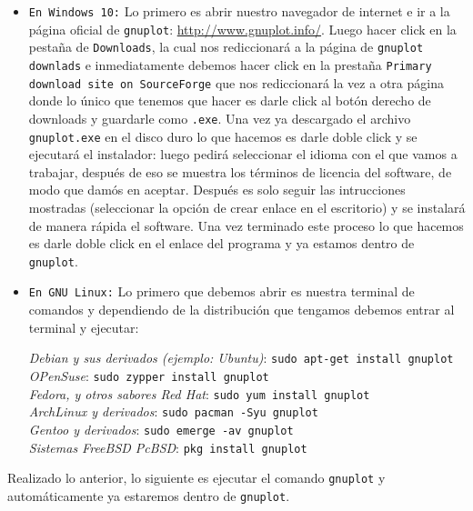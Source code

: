 \documentclass[11.5pt,a4paper]{article}
\begin{document}
\begin{itemize}
\item \texttt{En Windows 10:} Lo primero es abrir nuestro navegador de internet e ir a la página oficial de \texttt{gnuplot}: \url{http://www.gnuplot.info/}. Luego hacer click en la pestaña de \texttt{Downloads}, la cual nos rediccionará a la página de \texttt{gnuplot downlads} e inmediatamente debemos hacer click en la prestaña \texttt{Primary download site on SourceForge} que nos rediccionará la vez a otra página donde lo único que tenemos que hacer es darle click al botón derecho de downloads y guardarle como \texttt{.exe}. Una vez ya descargado el archivo \texttt{gnuplot.exe} en el disco duro lo que hacemos es darle doble click y se ejecutará el instalador: luego pedirá seleccionar el idioma con el que vamos a trabajar, después de eso se muestra los términos de licencia del software, de modo que damós en aceptar. Después es solo seguir las intrucciones mostradas (seleccionar la opción de crear enlace en el escritorio) y se instalará de manera rápida el software. Una vez terminado este proceso lo que hacemos es darle doble click en el enlace del programa y ya estamos dentro de \texttt{gnuplot}.    

\item \texttt{En GNU Linux:} Lo primero que debemos abrir es nuestra terminal de comandos y dependiendo de la distribución que tengamos debemos entrar al terminal y ejecutar:

\textit{Debian y sus derivados (ejemplo: Ubuntu)}:\hspace{1.0cm}  \texttt{sudo apt-get install gnuplot}\\
\textit{OPenSuse}:\hspace{5.9cm}  \texttt{sudo zypper install gnuplot}\\
\textit{Fedora, y otros sabores Red Hat}:\hspace{2.6cm}  \texttt{sudo yum install gnuplot}\\
\textit{ArchLinux y derivados}:\hspace{4.0cm}  \texttt{sudo pacman -Syu gnuplot}\\
\textit{Gentoo y derivados}:\hspace{4.5cm} \texttt{sudo emerge -av gnuplot}\\
\textit{Sistemas FreeBSD\/ PcBSD}:\hspace{3.4cm} \texttt{pkg install gnuplot}
\end{itemize}

Realizado lo anterior, lo siguiente es ejecutar el comando \texttt{gnuplot} y automáticamente ya estaremos dentro de \texttt{gnuplot}.
\end{document}
